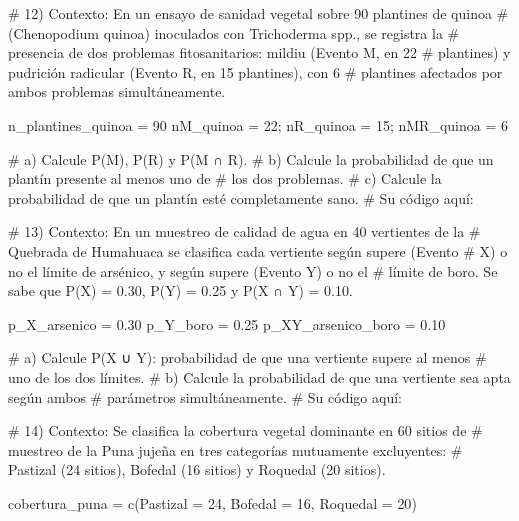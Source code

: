 \documentclass[
  spanish,
  letterpaper,
  DIV=11,
  numbers=noendperiod]{scrreprt}
\newenvironment{Shaded}{\begin{snugshade}}{\end{snugshade}}
\newcommand{\AttributeTok}[1]{\textcolor[rgb]{0.40,0.45,0.13}{#1}}
\newcommand{\CommentTok}[1]{\textcolor[rgb]{0.37,0.37,0.37}{#1}}
\newcommand{\DecValTok}[1]{\textcolor[rgb]{0.68,0.00,0.00}{#1}}
\newcommand{\FloatTok}[1]{\textcolor[rgb]{0.68,0.00,0.00}{#1}}
\newcommand{\FunctionTok}[1]{\textcolor[rgb]{0.28,0.35,0.67}{#1}}
\newcommand{\NormalTok}[1]{\textcolor[rgb]{0.00,0.23,0.31}{#1}}
\newcommand{\OtherTok}[1]{\textcolor[rgb]{0.00,0.23,0.31}{#1}}
\begin{document}
\begin{Shaded}
\begin{Highlighting}[]
\CommentTok{\# 12) Contexto: En un ensayo de sanidad vegetal sobre 90 plantines de quinoa}
\CommentTok{\#     (Chenopodium quinoa) inoculados con Trichoderma spp., se registra la}
\CommentTok{\#     presencia de dos problemas fitosanitarios: mildiu (Evento M, en 22}
\CommentTok{\#     plantines) y pudrición radicular (Evento R, en 15 plantines), con 6}
\CommentTok{\#     plantines afectados por ambos problemas simultáneamente.}

\NormalTok{n\_plantines\_quinoa }\OtherTok{=} \DecValTok{90}
\NormalTok{nM\_quinoa }\OtherTok{=} \DecValTok{22}\NormalTok{; nR\_quinoa }\OtherTok{=} \DecValTok{15}\NormalTok{; nMR\_quinoa }\OtherTok{=} \DecValTok{6}

\CommentTok{\#     a) Calcule P(M), P(R) y P(M ∩ R).}
\CommentTok{\#     b) Calcule la probabilidad de que un plantín presente al menos uno de}
\CommentTok{\#        los dos problemas.}
\CommentTok{\#     c) Calcule la probabilidad de que un plantín esté completamente sano.}
\CommentTok{\# Su código aquí:}


\CommentTok{\# 13) Contexto: En un muestreo de calidad de agua en 40 vertientes de la}
\CommentTok{\#     Quebrada de Humahuaca se clasifica cada vertiente según supere (Evento}
\CommentTok{\#     X) o no el límite de arsénico, y según supere (Evento Y) o no el}
\CommentTok{\#     límite de boro. Se sabe que P(X) = 0.30, P(Y) = 0.25 y P(X ∩ Y) = 0.10.}

\NormalTok{p\_X\_arsenico }\OtherTok{=} \FloatTok{0.30}
\NormalTok{p\_Y\_boro }\OtherTok{=} \FloatTok{0.25}
\NormalTok{p\_XY\_arsenico\_boro }\OtherTok{=} \FloatTok{0.10}

\CommentTok{\#     a) Calcule P(X ∪ Y): probabilidad de que una vertiente supere al menos}
\CommentTok{\#        uno de los dos límites.}
\CommentTok{\#     b) Calcule la probabilidad de que una vertiente sea apta según ambos}
\CommentTok{\#        parámetros simultáneamente.}
\CommentTok{\# Su código aquí:}


\CommentTok{\# 14) Contexto: Se clasifica la cobertura vegetal dominante en 60 sitios de}
\CommentTok{\#     muestreo de la Puna jujeña en tres categorías mutuamente excluyentes:}
\CommentTok{\#     Pastizal (24 sitios), Bofedal (16 sitios) y Roquedal (20 sitios).}

\NormalTok{cobertura\_puna }\OtherTok{=} \FunctionTok{c}\NormalTok{(}\AttributeTok{Pastizal =} \DecValTok{24}\NormalTok{, }\AttributeTok{Bofedal =} \DecValTok{16}\NormalTok{, }\AttributeTok{Roquedal =} \DecValTok{20}\NormalTok{)}


\end{Highlighting}
\end{Shaded}
\end{document}
